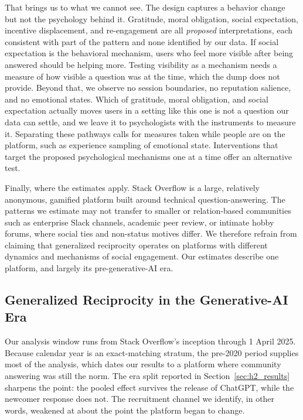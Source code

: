 That brings us to what we cannot see. The design captures a behavior change but not the psychology behind it. Gratitude, moral obligation, social expectation, incentive displacement, and re-engagement are all \textit{proposed} interpretations, each consistent with part of the pattern and none identified by our data. If social expectation is the behavioral mechanism, users who feel more visible after being answered should be helping more. Testing visibility as a mechanism needs a measure of how visible a question was at the time, which the dump does not provide. Beyond that, we observe no session boundaries, no reputation salience, and no emotional states. Which of gratitude, moral obligation, and social expectation actually moves users in a setting like this one is not a question our data can settle, and we leave it to psychologists with the instruments to measure it. Separating these pathways calls for measures taken while people are on the platform, such as experience sampling of emotional state. Interventions that target the proposed psychological mechanisms one at a time offer an alternative test.

Finally, where the estimates apply. Stack Overflow is a large, relatively anonymous, gamified platform built around technical question-answering. The patterns we estimate may not transfer to smaller or relation-based communities such as enterprise Slack channels, academic peer review, or intimate hobby forums, where social ties and non-status motives differ. We therefore refrain from claiming that generalized reciprocity operates on platforms with different dynamics and mechanisms of social engagement. Our estimates describe one platform, and largely its pre-generative-AI era.

\subsection{Generalized Reciprocity in the Generative-AI Era}
\label{sec:genai}

Our analysis window runs from Stack Overflow's inception through 1 April 2025. Because calendar year is an exact-matching stratum, the pre-2020 period supplies most of the analysis, which dates our results to a platform where community answering was still the norm. The era split reported in Section~\ref{sec:h2_results} sharpens the point: the pooled effect survives the release of ChatGPT, while the newcomer response does not. The recruitment channel we identify, in other words, weakened at about the point the platform began to change.

